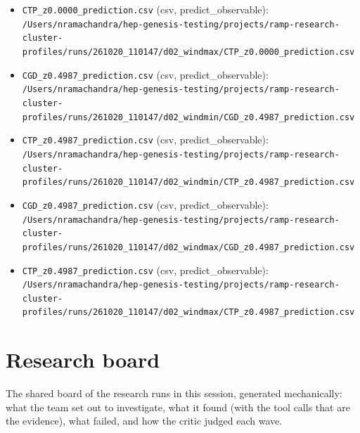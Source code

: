\documentclass[11pt,a4paper]{article}
\begin{document}
\begin{itemize}
  \item \texttt{CTP\_\allowbreak{}z0.0000\_\allowbreak{}prediction.csv} (csv, predict\_observable): \texttt{/\allowbreak{}Users/\allowbreak{}nramachandra/\allowbreak{}hep-genesis-testing/\allowbreak{}projects/\allowbreak{}ramp-research-cluster-profiles/\allowbreak{}runs/\allowbreak{}261020\_\allowbreak{}110147/\allowbreak{}d02\_\allowbreak{}windmax/\allowbreak{}CTP\_\allowbreak{}z0.0000\_\allowbreak{}prediction.csv}
  \item \texttt{CGD\_\allowbreak{}z0.4987\_\allowbreak{}prediction.csv} (csv, predict\_observable): \texttt{/\allowbreak{}Users/\allowbreak{}nramachandra/\allowbreak{}hep-genesis-testing/\allowbreak{}projects/\allowbreak{}ramp-research-cluster-profiles/\allowbreak{}runs/\allowbreak{}261020\_\allowbreak{}110147/\allowbreak{}d02\_\allowbreak{}windmin/\allowbreak{}CGD\_\allowbreak{}z0.4987\_\allowbreak{}prediction.csv}
  \item \texttt{CTP\_\allowbreak{}z0.4987\_\allowbreak{}prediction.csv} (csv, predict\_observable): \texttt{/\allowbreak{}Users/\allowbreak{}nramachandra/\allowbreak{}hep-genesis-testing/\allowbreak{}projects/\allowbreak{}ramp-research-cluster-profiles/\allowbreak{}runs/\allowbreak{}261020\_\allowbreak{}110147/\allowbreak{}d02\_\allowbreak{}windmin/\allowbreak{}CTP\_\allowbreak{}z0.4987\_\allowbreak{}prediction.csv}
  \item \texttt{CGD\_\allowbreak{}z0.4987\_\allowbreak{}prediction.csv} (csv, predict\_observable): \texttt{/\allowbreak{}Users/\allowbreak{}nramachandra/\allowbreak{}hep-genesis-testing/\allowbreak{}projects/\allowbreak{}ramp-research-cluster-profiles/\allowbreak{}runs/\allowbreak{}261020\_\allowbreak{}110147/\allowbreak{}d02\_\allowbreak{}windmax/\allowbreak{}CGD\_\allowbreak{}z0.4987\_\allowbreak{}prediction.csv}
  \item \texttt{CTP\_\allowbreak{}z0.4987\_\allowbreak{}prediction.csv} (csv, predict\_observable): \texttt{/\allowbreak{}Users/\allowbreak{}nramachandra/\allowbreak{}hep-genesis-testing/\allowbreak{}projects/\allowbreak{}ramp-research-cluster-profiles/\allowbreak{}runs/\allowbreak{}261020\_\allowbreak{}110147/\allowbreak{}d02\_\allowbreak{}windmax/\allowbreak{}CTP\_\allowbreak{}z0.4987\_\allowbreak{}prediction.csv}
\end{itemize}

\section{Research board}
\label{app:board}
The shared board of the research runs in this session, generated mechanically: what the team set out to investigate, what it found (with the tool calls that are the evidence), what failed, and how the critic judged each wave.
\end{document}
